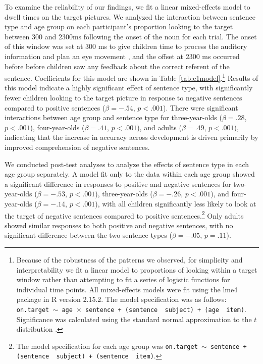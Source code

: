 \documentclass[man]{apa2}
\begin{document}
To examine the reliability of our findings, we fit a linear mixed-effects model to dwell times on the target pictures. We analyzed the interaction between sentence type and age group on each participant's proportion looking to the target between 300 and 2300ms following the onset of the noun for each trial.  The onset of this window was set at 300 ms to give children time to process the auditory information and plan an eye movement \cite{fernald2008, haith1993}, and the offset at 2300 ms occurred before before children saw any feedback about the correct referent of the sentence.   Coefficients for this model are shown in Table \ref{tab:e1model}.\footnote{Because of the robustness of the patterns we observed, for simplicity and interpretability we fit a linear model to proportions of looking within a target window rather than attempting to fit a series of logistic functions for individual time points. All mixed-effects models were fit using the lme4 package in R version 2.15.2.  The model specification was as follows: \texttt{on.target $\sim$ age~$\times$~sentence + (sentence~\textbar~subject) +  (age~\textbar~item)}.  Significance was calculated using the standard normal approximation to the $t$ distribution \cite{barr2013}.} Results of this model indicate a highly significant effect of sentence type, with significantly fewer children looking to the target picture in response to negative sentences compared to positive sentences ($\beta= -.54$, $p< .001$).   There were significant interactions between age group and sentence type for three-year-olds ($\beta = .28$, $p< .001$), four-year-olds ($\beta = .41$, $p< .001$), and adults ($\beta = .49$, $p< .001$), indicating that the increase in accuracy across development is driven primarily by improved comprehension of negative sentences.  

We conducted post-test analyses to analyze the effects of sentence type in each age group separately.  A model fit only to the data within each age group showed a significant difference in responses to positive and negative sentences for two-year-olds ($\beta = -.53$, $p< .001$), three-year-olds ($\beta = -.26$, $p< .001$), and four-year-olds ($\beta = -.14$, $p< .001$), with all children significantly less likely to look at the target of negative sentences compared to positive sentences.\footnote{The model specification for each age group was \texttt{on.target $\sim$ sentence + (sentence~\textbar~subject) +  (sentence~\textbar~item)}.}  Only adults showed similar responses to both positive and negative sentences, with no significant difference between the two sentence types ($\beta = -.05$, $p=.11$).  
\end{document}
